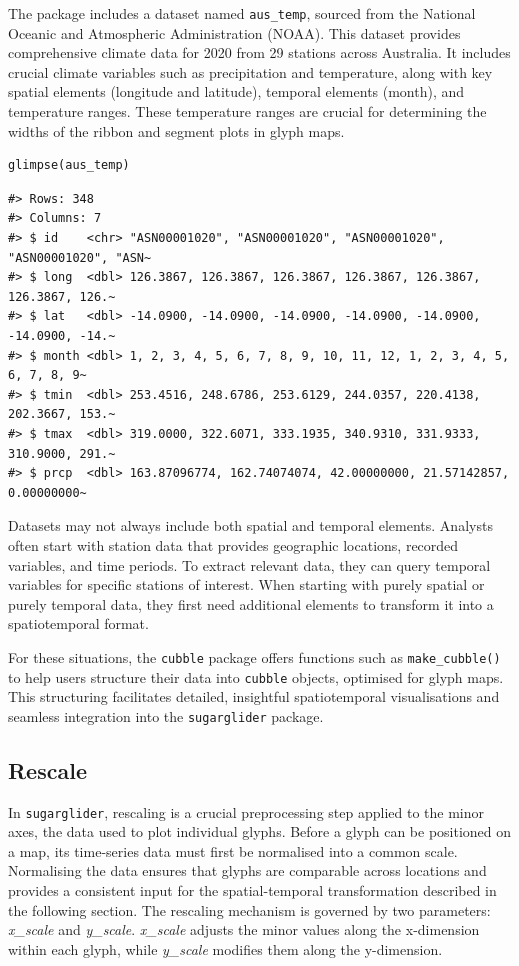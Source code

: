 The package includes a dataset named \texttt{aus\_temp}, sourced from the National Oceanic and Atmospheric Administration (NOAA). This dataset provides comprehensive climate data for 2020 from 29 stations across Australia. It includes crucial climate variables such as precipitation and temperature, along with key spatial elements (longitude and latitude), temporal elements (month), and temperature ranges. These temperature ranges are crucial for determining the widths of the ribbon and segment plots in glyph maps.

\begin{verbatim}
glimpse(aus_temp)
\end{verbatim}

\begin{verbatim}
#> Rows: 348
#> Columns: 7
#> $ id    <chr> "ASN00001020", "ASN00001020", "ASN00001020", "ASN00001020", "ASN~
#> $ long  <dbl> 126.3867, 126.3867, 126.3867, 126.3867, 126.3867, 126.3867, 126.~
#> $ lat   <dbl> -14.0900, -14.0900, -14.0900, -14.0900, -14.0900, -14.0900, -14.~
#> $ month <dbl> 1, 2, 3, 4, 5, 6, 7, 8, 9, 10, 11, 12, 1, 2, 3, 4, 5, 6, 7, 8, 9~
#> $ tmin  <dbl> 253.4516, 248.6786, 253.6129, 244.0357, 220.4138, 202.3667, 153.~
#> $ tmax  <dbl> 319.0000, 322.6071, 333.1935, 340.9310, 331.9333, 310.9000, 291.~
#> $ prcp  <dbl> 163.87096774, 162.74074074, 42.00000000, 21.57142857, 0.00000000~
\end{verbatim}

Datasets may not always include both spatial and temporal elements. Analysts often start with station data that provides geographic locations, recorded variables, and time periods. To extract relevant data, they can query temporal variables for specific stations of interest. When starting with purely spatial or purely temporal data, they first need additional elements to transform it into a spatiotemporal format.

For these situations, the \texttt{cubble} package offers functions such as \texttt{make\_cubble()} to help users structure their data into \texttt{cubble} objects, optimised for glyph maps. This structuring facilitates detailed, insightful spatiotemporal visualisations and seamless integration into the \texttt{sugarglider} package.

\subsection{Rescale}\label{rescale}

In \texttt{sugarglider}, rescaling is a crucial preprocessing step applied to the minor axes, the data used to plot individual glyphs. Before a glyph can be positioned on a map, its time-series data must first be normalised into a common scale. Normalising the data ensures that glyphs are comparable across locations and provides a consistent input for the spatial-temporal transformation described in the following section. The rescaling mechanism is governed by two parameters: \emph{x\_scale} and \emph{y\_scale}. \emph{x\_scale} adjusts the minor values along the x-dimension within each glyph, while \emph{y\_scale} modifies them along the y-dimension.

